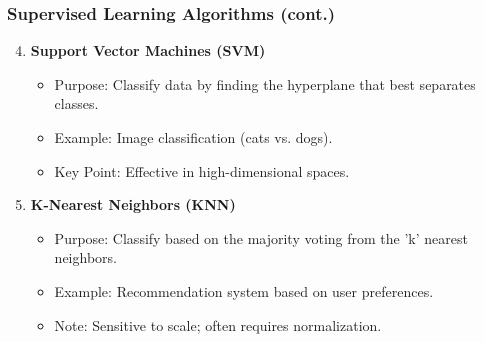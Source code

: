 \documentclass[aspectratio=169]{beamer}
\begin{document}
\begin{frame}[fragile]
    \frametitle{Supervised Learning Algorithms (cont.)}
    \begin{enumerate}
        \setcounter{enumi}{3} %
        \item \textbf{Support Vector Machines (SVM)}
        \begin{itemize}
            \item Purpose: Classify data by finding the hyperplane that best separates classes.
            \item Example: Image classification (cats vs. dogs).
            \item Key Point: Effective in high-dimensional spaces.
        \end{itemize}
        
        \item \textbf{K-Nearest Neighbors (KNN)}
        \begin{itemize}
            \item Purpose: Classify based on the majority voting from the 'k' nearest neighbors.
            \item Example: Recommendation system based on user preferences.
            \item Note: Sensitive to scale; often requires normalization.
        \end{itemize}
    \end{enumerate}
    
\end{frame}
\end{document}
